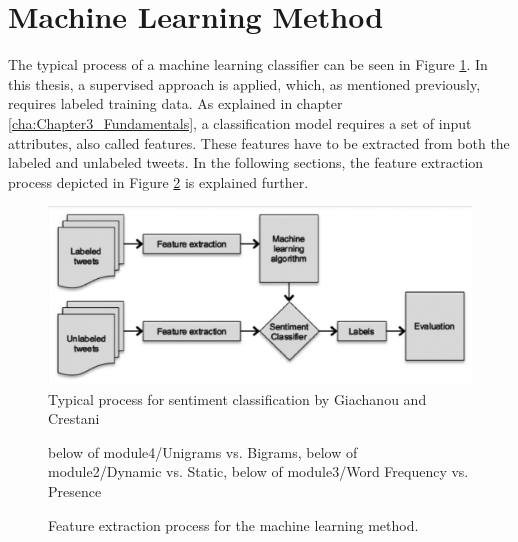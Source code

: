 \section{Machine Learning Method}
The typical process of a machine learning classifier can be seen in Figure \ref{fig:ml_approach}. In this thesis, a supervised approach is applied, which, as mentioned previously, requires labeled training data.
As explained in chapter \ref{cha:Chapter3_Fundamentals}, a classification model requires a set of input attributes, also called features. These features have to be extracted from both the labeled and unlabeled tweets. In the following sections, the feature extraction process depicted in Figure \ref{fig:ml_process} is explained further.
\begin{figure}
    \centering
    \includegraphics[scale=0.5]{Images/ML_approach.png}
    \caption{Typical process for sentiment classification by Giachanou and Crestani \cite[p.~28:3]{DBLP:journals/csur/GiachanouC16}}
    \label{fig:ml_approach}
\end{figure}


\begin{figure}
    \centering

    {below of module4/Unigrams vs. Bigrams, below of module2/Dynamic vs. Static, below of module3/Word Frequency vs. Presence} 


    \vspace{25mm}

   \caption{Feature extraction process for the machine learning method.}
    \label{fig:ml_process}
\end{figure}

